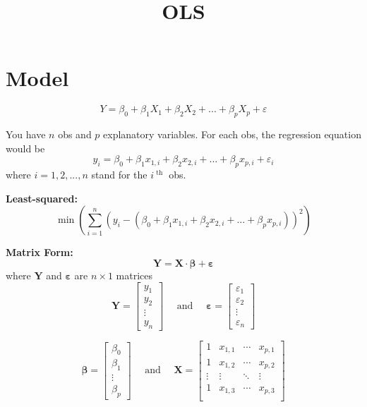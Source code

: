 \documentclass[12pt]{article}
\title{OLS}
\author{}
\date{}
\begin{document}
\maketitle


\section{Model}
\begin{equation*}
Y = \beta_0 + \beta_1 X_1 + \beta_2X_2 + ... + \beta_{p}X_{p} +
\varepsilon
\end{equation*}

You have $ n $ obs and $ p $ explanatory variables. For each obs, the
regression equation would be
\begin{equation*}
		y_{i} = \beta_0 + \beta_1x_{1,i} + \beta_2x_{2,i} + ... + 
		\beta_{p}x_{p,i} + \varepsilon_{i}
\end{equation*}
where $ i = 1,2,...,n $ stand for the $ i^{\text{ th }} $ obs.


{\textbf {Least-squared:}}
\begin{equation*}
\min_{\substack{\\}} \left( 
		\sum\limits_{i = 1} ^n(
		y_{i} - (\beta_0 + \beta_1x_{1,i} + \beta_2x_{2,i} + ... + 
		\beta_{p}x_{p,i})
		)	^{2}
\right)  
\end{equation*}


{\textbf {Matrix Form:}}
\begin{equation*}
\bm{Y} = \bm{X}\cdot \bm{\beta} + \bm{\varepsilon}
\end{equation*}
where $ \bm{Y} $ and $ \bm{\varepsilon} $ are $ n  \times 1 $ matrices
\begin{equation*}
\bm{Y} = 
\begin{bmatrix}
y_1\\y_2\\ \vdots  \\y_{n}
\end{bmatrix}
\quad
\text{ and }
\quad
\bm{\varepsilon} = 
\begin{bmatrix}
\varepsilon_1\\\varepsilon_2\\ \vdots  \\\varepsilon_{n}
\end{bmatrix}
\end{equation*}


\begin{equation*}
\bm{\beta} = 
\begin{bmatrix}
\beta_0\\\beta_1\\ \vdots \\\beta_{p}
\end{bmatrix}
\quad
\text{ and }
\quad
\bm{X} = 
\begin{bmatrix}
1 & x_{1,1} &\cdots&x_{p,1}\\
1 & x_{1,2} &\cdots&x_{p,2}\\
\vdots & \vdots &\ddots &\vdots \\
1 & x_{1,3} &\cdots&x_{p,3}\\
\end{bmatrix}
\end{equation*}
\end{document}

